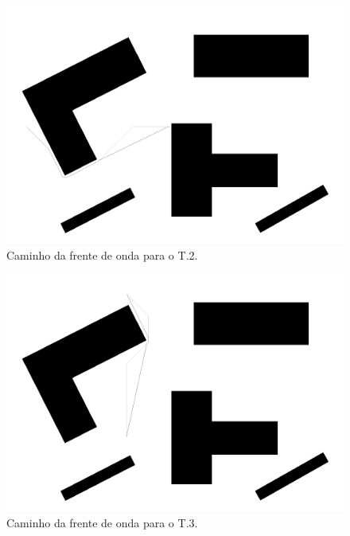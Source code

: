 \documentclass[12pt]{article}
\theoremstyle{plain}
\numberwithin{equation}{section}
\begin{document}
\begin{figure}[H]
  \centering\includegraphics[scale=0.4]{imgs/wavefront_path_2.png}
  \caption{Caminho da frente de onda para o T.2.}
\end{figure}

\begin{figure}[H]
  \centering\includegraphics[scale=0.4]{imgs/wavefront_path_3.png}
  \caption{Caminho da frente de onda para o T.3.}
\end{figure}
\end{document}
